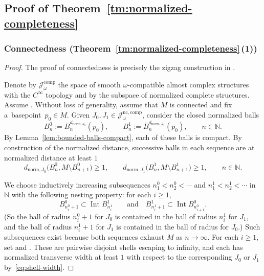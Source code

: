 \documentclass[pdftex]{sigma}
\numberwithin{equation}{section}
\newcommand{\bN}{{\mathbb N}}
\theoremstyle{definition}
\begin{document}
\subsection{Proof of Theorem~\ref{tm:normalized-completeness}}

\subsubsection[Connectedness (Theorem~1.6 (1))]{Connectedness (Theorem~\ref{tm:normalized-completeness}\,(1))}
\begin{proof}%
The proof of connectedness is precisely the zigzag construction in \cite[Theorem~4.7]{GromanFloerOpen}.

Denote by $\mathcal{J}^{\mathrm{comp}}_\omega$ the space of smooth $\omega$-compatible almost complex structures with the $C^\infty$ topology and by  the subspace of normalized complete structures.
Assume .
Without loss of generality, assume that $M$ is connected and fix a~basepoint~${p_0\in M}$.
Given $J_0,J_1\in\mathcal{J}^{\mathrm{nc,comp}}_\omega$, consider the closed normalized balls
\[
B_n^0:=\overline B^{d_{\mathrm{norm},J_0}}_{n}(p_0),\qquad B_n^1:=\overline B^{d_{\mathrm{norm},J_1}}_{n}(p_0),\qquad n\in\bN.
\]
By Lemma~\ref{lem:bounded-balls-compact}, each of these balls is compact.
By construction of the normalized distance, successive balls in each sequence are at normalized distance at least $1$
\begin{equation}\label{eq:shell-width}
d_{\mathrm{norm},J_0}\bigl( B_n^0, M\setminus B_{n+1}^0\bigr)\ge 1,\qquad d_{\mathrm{norm},J_1}\bigl( B_n^1, M\setminus B_{n+1}^1\bigr)\ge 1,\qquad n\in\bN.
\end{equation}

We choose inductively increasing subsequences $n_1^0<n_2^0<\cdots$ and $n_1^1<n_2^1<\cdots$ in $\bN$ with the following nesting property: for each $i\ge 1$,
\[
B_{n_i^0+1}^0 \subset \operatorname{Int} B_{n_i^1}^1
\qquad \text{and} \quad B_{n_i^1+1}^1 \subset \operatorname{Int}B_{n_{i+1}^0}^0.
\]
(So the ball of radius $n_i^0+1$ for $J_0$ is contained in the ball of radius $n_i^1$ for $J_1$, and the ball of radius $n_i^1+1$ for $J_1$ is contained in the ball of radius  for $J_0$.)
Such subsequences exist because both sequences exhaust $M$ as $n\to\infty$.
For each $i\ge 1$, set  and .
These are pairwise disjoint shells escaping to infinity, and each has normalized transverse width at least $1$ with respect to the corresponding $J_0$ or $J_1$ by~\eqref{eq:shell-width}.


\end{proof}
\end{document}
